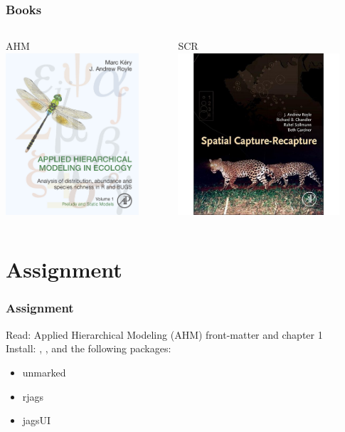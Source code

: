 \documentclass[color=usenames,dvipsnames,handout]{beamer}\usepackage[]{graphicx}\usepackage[]{color}
\begin{document}
\begin{frame}
  \frametitle{Books}
  \begin{columns}[c]
    \begin{column}{0.5\textwidth}
      \centering
      AHM \\
      \includegraphics[height=6cm]{figs/KeryRoyleBookCover} \\
    \end{column}
    \hfill
    \begin{column}{0.5\textwidth}
      \centering
      SCR \\
      \includegraphics[height=6cm]{figs/SCRcover} \\
    \end{column}
  \end{columns}
\end{frame}



\section{Assignment}


\begin{frame}
  \frametitle{Assignment}
  \Large
  Read: Applied Hierarchical Modeling (AHM) front-matter and chapter 1 \\
  \vfill
  Install: \href{https://sourceforge.net/projects/mcmc-jags/files/}{\jags},
  \href{https://www.r-project.org/}{\R}, and the following packages:
  \begin{itemize}
    \tt
    \item unmarked
    \item rjags
    \item jagsUI
  \end{itemize}

\end{frame}
\end{document}
